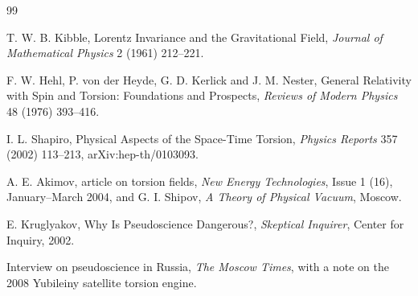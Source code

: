 \documentclass[11pt]{article}
\begin{document}
\begin{thebibliography}{99}

 T. W. B. Kibble, Lorentz Invariance and the Gravitational Field, \emph{Journal of Mathematical Physics} 2 (1961) 212--221.

 F. W. Hehl, P. von der Heyde, G. D. Kerlick and J. M. Nester, General Relativity with Spin and Torsion: Foundations and Prospects, \emph{Reviews of Modern Physics} 48 (1976) 393--416.

 I. L. Shapiro, Physical Aspects of the Space-Time Torsion, \emph{Physics Reports} 357 (2002) 113--213, arXiv:hep-th/0103093.

 A. E. Akimov, article on torsion fields, \emph{New Energy Technologies}, Issue 1 (16), January--March 2004, and G. I. Shipov, \emph{A Theory of Physical Vacuum}, Moscow.

 E. Kruglyakov, Why Is Pseudoscience Dangerous?, \emph{Skeptical Inquirer}, Center for Inquiry, 2002.

 Interview on pseudoscience in Russia, \emph{The Moscow Times}, with a note on the 2008 Yubileiny satellite torsion engine.

\end{thebibliography}
\end{document}
